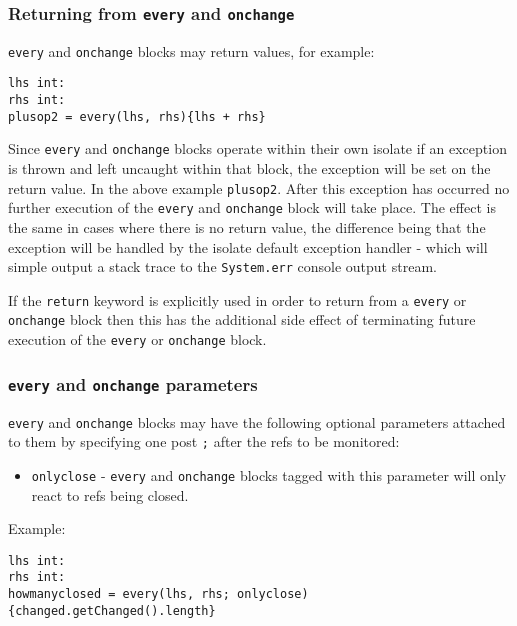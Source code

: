 \documentclass[conc-doc]{subfiles}
\begin{document}
\subsubsection{Returning from \lstinline{every} and \lstinline{onchange}}
\label{subsubsec:returnEveryonechange}
\lstinline{every} and \lstinline{onchange} blocks may return values, for example:

\begin{lstlisting}
lhs int:
rhs int:
plusop2 = every(lhs, rhs){lhs + rhs}
\end{lstlisting}	

Since \lstinline{every} and \lstinline{onchange} blocks operate within their own isolate if an exception is thrown and left uncaught within that block, the exception will be set on the return value. In the above example \lstinline{plusop2}. After this exception has occurred no further execution of the \lstinline{every} and \lstinline{onchange} block will take place. The effect is the same in cases where there is no return value, the difference being that the exception will be handled by the isolate default exception handler - which will simple output a stack trace to the \lstinline{System.err} console output stream.

If the \lstinline{return} keyword is explicitly used in order to return from a \lstinline{every} or \lstinline{onchange} block then this has the additional side effect of terminating future execution of the \lstinline{every} or \lstinline{onchange} block.

\subsubsection{\lstinline{every} and \lstinline{onchange} parameters}
\lstinline{every} and \lstinline{onchange} blocks may have the following optional parameters attached to them by specifying one post \lstinline{;} after the refs to be monitored:

\begin{itemize}
	\item \lstinline{onlyclose} - \lstinline{every} and \lstinline{onchange} blocks tagged with this parameter will only react to refs being closed.
\end{itemize}

Example:

\begin{lstlisting}
lhs int:
rhs int:
howmanyclosed = every(lhs, rhs; onlyclose){changed.getChanged().length}
\end{lstlisting}	
\end{document}
